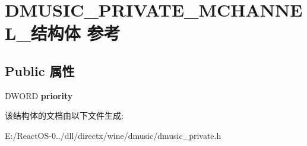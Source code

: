 \hypertarget{struct_d_m_u_s_i_c___p_r_i_v_a_t_e___m_c_h_a_n_n_e_l__}{}\section{D\+M\+U\+S\+I\+C\+\_\+\+P\+R\+I\+V\+A\+T\+E\+\_\+\+M\+C\+H\+A\+N\+N\+E\+L\+\_\+结构体 参考}
\label{struct_d_m_u_s_i_c___p_r_i_v_a_t_e___m_c_h_a_n_n_e_l__}
\subsection*{Public 属性}
\begin{DoxyCompactItemize}
\item 
\mbox{\label{struct_d_m_u_s_i_c___p_r_i_v_a_t_e___m_c_h_a_n_n_e_l___adfb9a4e49b839fe7453ea51a9f4de5c1}} 
D\+W\+O\+RD {\bfseries priority}
\end{DoxyCompactItemize}


该结构体的文档由以下文件生成\+:\begin{DoxyCompactItemize}
\item 
E\+:/\+React\+O\+S-\/0../dll/directx/wine/dmusic/dmusic\+\_\+private.\+h\end{DoxyCompactItemize}
